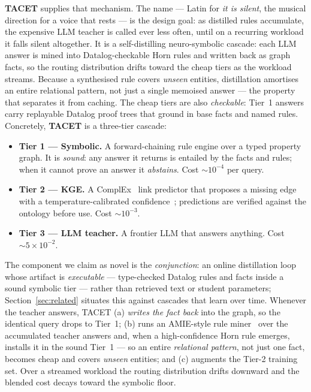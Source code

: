 \documentclass[11pt]{article}
\theoremstyle{plain}
\begin{document}
\textbf{TACET} supplies that mechanism. The name --- Latin for \emph{it is
silent}, the musical direction for a voice that rests --- is the design goal:
as distilled rules accumulate, the expensive LLM teacher is called ever less
often, until on a recurring workload it falls silent altogether. It is a
self-distilling neuro-symbolic cascade: each LLM answer is mined into
Datalog-checkable Horn rules and written back as graph facts, so the routing
distribution drifts toward the cheap tiers as the workload streams. Because a synthesised rule
covers \emph{unseen} entities, distillation amortises an entire relational
pattern, not just a single memoised answer --- the property that separates it
from caching. The cheap tiers are also \emph{checkable}: Tier~1 answers carry
replayable Datalog proof trees that ground in base facts and named rules.
Concretely, \textbf{TACET} is a three-tier cascade:

\begin{itemize}
  \item \textbf{Tier 1 --- Symbolic.} A forward-chaining rule engine over a
  typed property graph. It is \emph{sound}: any answer it returns is
  entailed by the facts and rules; when it cannot prove an answer it
  \emph{abstains}. Cost ${\sim}10^{-4}$ per query.
  \item \textbf{Tier 2 --- KGE.} A ComplEx~\citep{trouillon2016complex}
  link predictor that proposes a missing edge with a temperature-calibrated
  confidence~\citep{guo2017calibration}; predictions are verified against
  the ontology before use. Cost ${\sim}10^{-3}$.
  \item \textbf{Tier 3 --- LLM teacher.} A frontier LLM that answers
  anything. Cost ${\sim}5\times10^{-2}$.
\end{itemize}

The component we claim as novel is the \emph{conjunction}: an online
distillation loop whose artifact is \emph{executable} --- type-checked
Datalog rules and facts inside a sound symbolic tier --- rather than
retrieved text or student parameters; Section~\ref{sec:related} situates
this against cascades that learn over time. Whenever the
teacher answers, TACET (a) \emph{writes the fact back} into the graph, so
the identical query drops to Tier~1; (b) runs an AMIE-style rule
miner~\citep{galarraga2015amie} over the accumulated teacher answers and,
when a high-confidence Horn rule emerges, installs it in the sound Tier~1
--- so an entire \emph{relational pattern}, not just one fact, becomes
cheap and covers \emph{unseen} entities; and (c) augments the Tier-2
training set. Over a streamed workload the routing distribution drifts
downward and the blended cost decays toward the symbolic floor.
\end{document}
